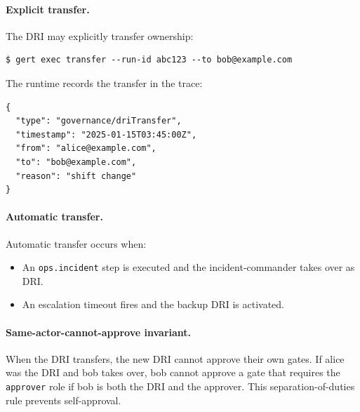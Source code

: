 \paragraph{Explicit transfer.}
The DRI may explicitly transfer ownership:

\begin{verbatim}
$ gert exec transfer --run-id abc123 --to bob@example.com
\end{verbatim}

The runtime records the transfer in the trace:

\begin{verbatim}
{
  "type": "governance/driTransfer",
  "timestamp": "2025-01-15T03:45:00Z",
  "from": "alice@example.com",
  "to": "bob@example.com",
  "reason": "shift change"
}
\end{verbatim}

\paragraph{Automatic transfer.}
Automatic transfer occurs when:
\begin{itemize}
  \item An \texttt{ops.incident} step is executed and the incident-commander takes over as DRI.
  \item An escalation timeout fires and the backup DRI is activated.
\end{itemize}

\paragraph{Same-actor-cannot-approve invariant.}
When the DRI transfers, the new DRI cannot approve their own gates. If alice was the DRI and bob takes over, bob cannot approve a gate that requires the \texttt{approver} role if bob is both the DRI and the approver. This separation-of-duties rule prevents self-approval.
